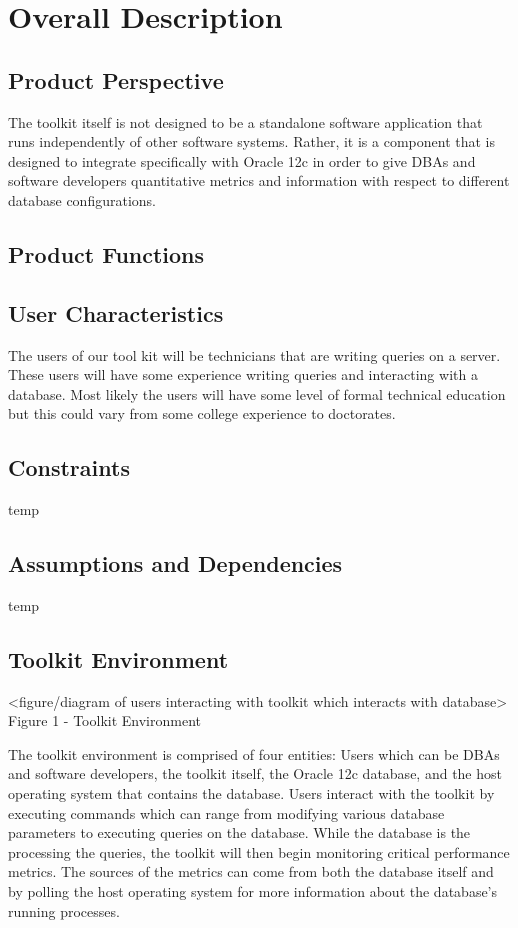 \documentclass[draftclsnofoot, onecolumn, 10pt]{IEEEtran}
\begin{document}
\section{Overall Description}

\subsection{Product Perspective}
The toolkit itself is not designed to be a standalone software application that runs independently of other software systems. Rather, it is a component that is designed to integrate specifically with Oracle 12c in order to give DBAs and software developers quantitative metrics and information with respect to different database configurations.

\subsection{Product Functions}

\subsection{User Characteristics}
The users of our tool kit will be technicians that are writing queries on a server. These users will have some experience writing queries and interacting with a database. Most likely the users will have some level of formal technical education but this could vary from some college experience to doctorates.  

\subsection{Constraints}
temp
\subsection{Assumptions and Dependencies}
temp

\subsection{Toolkit Environment}
<figure/diagram of users interacting with toolkit which interacts with database>
Figure 1 - Toolkit Environment

The toolkit environment is comprised of four entities: Users which can be DBAs and software developers, the toolkit itself, the Oracle 12c database, and the host operating system that contains the database. Users interact with the toolkit by executing commands which can range from modifying various database parameters to executing queries on the database. While the database is the processing the queries, the toolkit will then begin monitoring critical performance metrics. The sources of the metrics can come from both the database itself and by polling the host operating system for more information about the database’s running processes.
\end{document}
